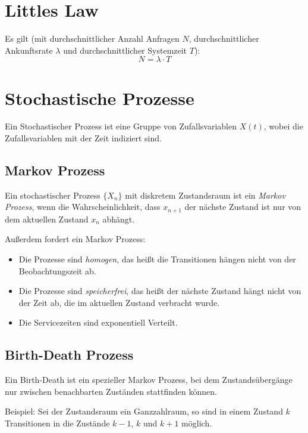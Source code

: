 \documentclass[a4paper, 11pt, accentcolor = tud3b]{tudreport}
\begin{document}
		\section{Littles Law}
			Es gilt (mit durchschnittlicher Anzahl Anfragen \(N\), durchschnittlicher Ankunftsrate \(\lambda\) und durchschnittlicher Systemzeit \(T\)):
			\begin{equation*}
				N = \lambda \cdot T
			\end{equation*}
	        
		\section{Stochastische Prozesse}
			Ein Stochastischer Prozess ist eine Gruppe von Zufallsvariablen \( X(t) \), wobei die Zufallsvariablen mit der Zeit indiziert sind.
			
			\subsection{Markov Prozess}
				Ein stochastischer Prozess \( \{ X _ n \} \) mit diskretem Zustandsraum ist ein \textit{Markov Prozess}, wenn die Wahrscheinlichkeit, dass \( x _ {n + 1} \) der nächste Zustand ist nur von dem aktuellen Zustand \( x _ n \) abhängt.
				
				Außerdem fordert ein Markov Prozess:
				\begin{itemize}
					\item Die Prozesse sind \textit{homogen}, das heißt die Transitionen hängen nicht von der Beobachtungszeit ab.
					\item Die Prozesse sind \textit{speicherfrei}, das heißt der nächste Zustand hängt nicht von der Zeit ab, die im aktuellen Zustand verbracht wurde.
					\item Die Servicezeiten sind exponentiell Verteilt.
				\end{itemize}
			
			\subsection{Birth-Death Prozess} %
				Ein Birth-Death ist ein spezieller Markov Prozess, bei dem Zustandsübergänge nur zwischen benachbarten Zuständen stattfinden können.
				
				Beispiel: Sei der Zustandsraum ein Ganzzahlraum, so sind in einem Zustand \( k \) Transitionen in die Zustände \( k - 1 \), \( k \) und \( k + 1 \) möglich.
				
\end{document}
